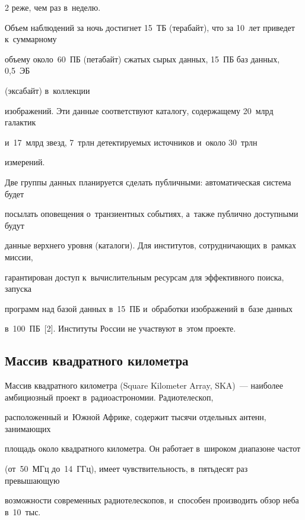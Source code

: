 \begin{multicols}{2}
реже, чем раз в~неделю.


  


  Объем наблюдений за ночь достигнет 15~ТБ (терабайт), что за 10~лет приведет к~суммарному 


объему около~60~ПБ  (петабайт) сжатых сырых данных, 15~ПБ  баз данных, 0,5~ЭБ


(эксабайт)  в~коллекции 


изображений. Эти данные соответствуют каталогу, содержащему 20~млрд галактик 


и~17~млрд звезд, 7~трлн детектируемых источников и~около 30~трлн 


измерений.


  


  Две группы данных планируется сделать пуб\-лич\-ны\-ми: автоматическая система будет 


посылать оповещения о~транзиентных событиях, а~также пуб\-лич\-но доступными будут 


данные верхнего уровня (катало\-ги). Для институтов, сотрудничающих в~рамках миссии, 


гарантирован доступ к~вычислительным ресурсам для эффективного поиска, запуска 


программ над базой данных в~15~ПБ и~обработки изображений в~базе данных 


в~100~ПБ~[2]. Институты России не участвуют в~этом проекте. 





\subsection{Массив квадратного километра} 





Массив квадратного километра (Square Kilometer Array, SKA)~--- наиболее амбициозный проект в~радиоастрономии. Радиотелескоп, 


расположенный и~Южной Африке, содержит тысячи отдельных антенн, занимающих 


площадь около квадратного километра. Он работает в~широком диапазоне час\-тот 


(от~50~МГц до~14~ГГц), имеет чувствительность, в~пятьдесят раз превышающую 


возможности современных радиотелескопов, и~способен производить обзор неба в~10~тыс.\



\end{multicols}
